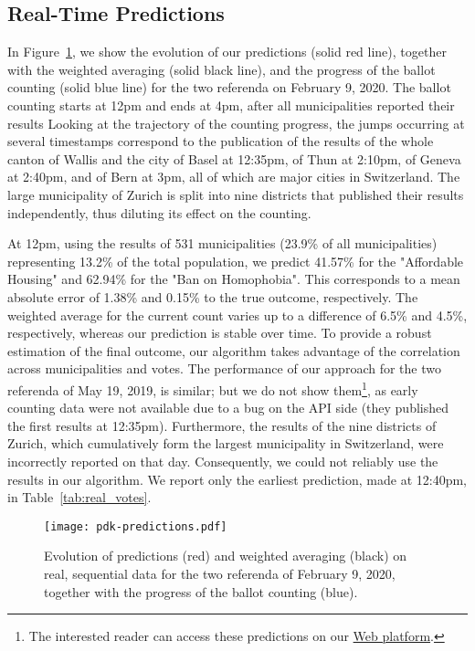 \subsection{Real-Time Predictions}

In Figure~\ref{fig:predictions}, we show the evolution of our predictions (solid red line), together with the weighted averaging (solid black line), and the progress of the ballot counting (solid blue line) for the two referenda on February 9, 2020.
The ballot counting starts at 12pm and ends at 4pm, after all municipalities reported their results
Looking at the trajectory of the counting progress, the jumps occurring at several timestamps correspond to the publication of the results of the whole canton of Wallis and the city of Basel at 12:35pm, of Thun at 2:10pm, of Geneva at 2:40pm, and of Bern at 3pm, all of which are major cities in Switzerland.
The large municipality of Zurich is split into nine districts that published their results independently, thus diluting its effect on the counting.

At 12pm, using the results of 531 municipalities (23.9\% of all municipalities) representing 13.2\% of the total population, we predict 41.57\% for the "Affordable Housing" and 62.94\% for the "Ban on Homophobia".
This corresponds to a mean absolute error of 1.38\% and 0.15\% to the true outcome, respectively.
The weighted average for the current count varies up to a difference of 6.5\% and 4.5\%, respectively, whereas our prediction is stable over time.
To provide a robust estimation of the final outcome, our algorithm takes advantage of the correlation across municipalities and votes.
The performance of our approach for the two referenda of May 19, 2019, is similar; but we do not show them\footnote{The interested reader can access these predictions on our \href{http://www.predikon.ch}{Web platform}.}, as early counting data were not available due to a bug on the API side (they published the first results at 12:35pm).
Furthermore, the results of the nine districts of Zurich, which cumulatively form the largest municipality in Switzerland, were incorrectly reported on that day.
Consequently, we could not reliably use the results in our algorithm.
We report only the earliest prediction, made at 12:40pm, in Table~\ref{tab:real_votes}.

\begin{figure}
	\texttt{[image: pdk-predictions.pdf]}
	\caption{
		Evolution of predictions (red) and weighted averaging (black) on real, sequential data for the two referenda of February 9, 2020, together with the progress of the ballot counting (blue).
	}
	\label{fig:predictions}
\end{figure}

